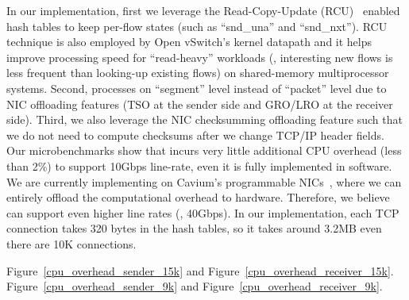 In our implementation, first we leverage the Read-Copy-Update (RCU)~\cite{guniguntala2008read} enabled hash tables
to keep per-flow states (such as ``snd\_una'' and ``snd\_nxt''). RCU technique is also employed by
Open vSwitch's kernel datapath and it helps improve processing speed for ``read-heavy''
workloads (\eg{}, interesting new flows is less frequent than looking-up existing flows) on
shared-memory multiprocessor systems.
Second, \acdc{} processes on ``segment'' level instead of ``packet'' level due to
NIC offloading features (TSO at the sender side and GRO/LRO at the receiver side).
Third, we also leverage the NIC checksumming offloading feature such that
we do not need to compute checksums after we change TCP/IP header fields.
Our microbenchmarks show that \acdc{} incurs very little additional CPU overhead (less than 2\%) to
support 10Gbps line-rate, even it is fully implemented in software.
We are currently implementing \acdc{} on Cavium's programmable NICs~\cite{cavium-nic},
where we can entirely offload the computational overhead to hardware. Therefore, we believe
\acdc{} can support even higher line rates (\eg{}, 40Gbps).
In our implementation, each TCP connection takes 320 bytes in the hash tables,
so it takes around 3.2MB even there are 10K connections.

Figure~\ref{cpu_overhead_sender_15k} and Figure~\ref{cpu_overhead_receiver_15k}.
Figure~\ref{cpu_overhead_sender_9k} and Figure~\ref{cpu_overhead_receiver_9k}.
